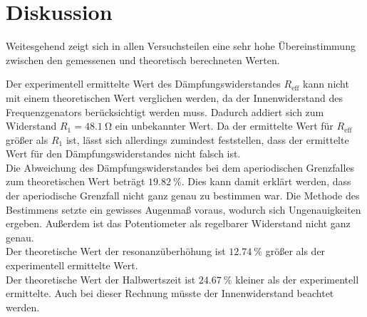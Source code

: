 \section{Diskussion}
\label{sec:Diskussion}

Weitesgehend zeigt sich in allen Versuchsteilen eine sehr hohe Übereinstimmung 
zwischen den gemessenen und theoretisch berechneten Werten.

Der experimentell ermittelte Wert des Dämpfungswiderstandes $R_\text{eff}$ kann
nicht mit einem theoretischen Wert verglichen werden, da der Innenwiderstand 
des Frequenzgenators berücksichtigt werden muss. Dadurch addiert sich zum Widerstand
$R_1 = \SI{48.1}{\ohm}$ ein unbekannter Wert. Da der ermittelte Wert für $R_\text{eff}$
größer als $R_1$ ist, lässt sich allerdings zumindest feststellen, dass der ermittelte
Wert für den Dämpfungswiderstandes nicht falsch ist. \\
Die Abweichung des Dämpfungswiderstandes bei dem aperiodischen Grenzfalles zum 
theoretischen Wert beträgt $\SI{19.82}{\percent}$. Dies kann damit erklärt werden, 
dass der aperiodische Grenzfall nicht ganz genau zu bestimmen war. Die Methode 
des Bestimmens setzte ein gewisses Augenmaß voraus, wodurch sich Ungenauigkeiten 
ergeben. Außerdem ist das Potentiometer als regelbarer Widerstand nicht ganz 
genau. \\
Der theoretische Wert der resonanzüberhöhung ist $\SI{12.74}{\percent}$ größer als der 
experimentell ermittelte Wert. \\
Der theoretische Wert der Halbwertszeit ist $\SI{24.67}{\percent}$ kleiner als der 
experimentell ermittelte. Auch bei dieser Rechnung müsste der Innenwiderstand
beachtet werden. \\
